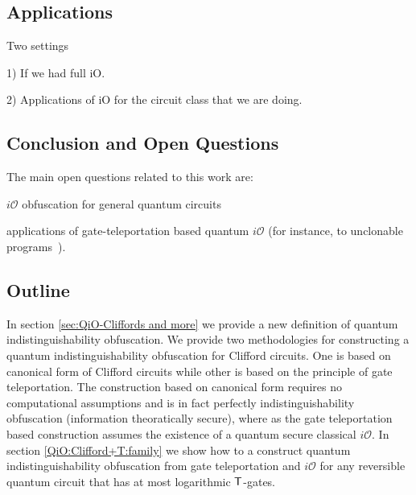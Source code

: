 

\subsection{Applications}
Two settings

1) If we had full iO.

2) Applications of iO for the circuit class that we are doing.


\subsection{Conclusion and Open Questions}

The main open questions related to this work are:

$i\mathcal{O}$ obfuscation for general quantum circuits

applications of gate-teleportation based quantum $i\mathcal{O}$ (for instance, to unclonable programs~\cite{Aar09}).


\subsection*{Outline}
In section \ref{sec:QiO-Cliffords and more} we provide a new definition of quantum indistinguishability obfuscation. We provide two methodologies for constructing a quantum indistinguishability obfuscation for Clifford circuits. One is based on canonical form of Clifford circuits  while other is based on the principle of gate teleportation.  The construction based on canonical form requires no computational assumptions and is in fact perfectly indistinguishability obfuscation (information theoratically secure), where as the gate teleportation based construction assumes the existence of a quantum secure classical $i\mathcal{O}.$ In section \ref{QiO:Clifford+T:family} we show how to a construct quantum indistinguishability obfuscation from gate teleportation and $i\mathcal{O}$ for any reversible quantum circuit that has at most logarithmic ${\sf T}$-gates.

